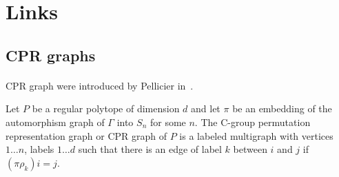 \section{Links}
\subsection{CPR graphs}

\paragraph{}
CPR graph were introduced by Pellicier in~\cite{cprGraph}.

\begin{definition}
  Let $P$ be a regular polytope of dimension $d$ and let $\pi$ be an embedding of the automorphism graph of $\Gamma$ into $S_n$ for some $n$. The C-group permutation representation graph or CPR graph of $P$ is a labeled multigraph with vertices ${1 \dots n}$, labels ${1 \dots d}$ such that there is an edge of label $k$ between $i$ and $j$ if $(\pi \rho_k)i = j$.
\end{definition}
